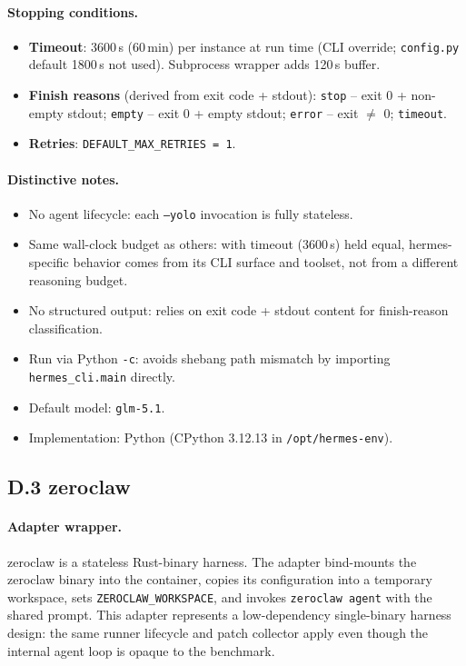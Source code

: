 \documentclass{llmxive}
\begin{document}
\paragraph{Stopping conditions.}
\begin{itemize}
  \item \textbf{Timeout}: 3600\,s (60\,min) per instance at run time (CLI override; \texttt{config.py} default 1800\,s not used). Subprocess wrapper adds 120\,s buffer.
  \item \textbf{Finish reasons} (derived from exit code + stdout): \texttt{stop} -- exit 0 + non-empty stdout; \texttt{empty} -- exit 0 + empty stdout; \texttt{error} -- exit $\neq$ 0; \texttt{timeout}.
  \item \textbf{Retries}: \texttt{DEFAULT\_MAX\_RETRIES = 1}.
\end{itemize}

\paragraph{Distinctive notes.}
\begin{itemize}
  \item No agent lifecycle: each \texttt{--yolo} invocation is fully stateless.
  \item Same wall-clock budget as others: with timeout (3600\,s) held equal, hermes-specific behavior comes from its CLI surface and toolset, not from a different reasoning budget.
  \item No structured output: relies on exit code + stdout content for finish-reason classification.
  \item Run via Python \texttt{-c}: avoids shebang path mismatch by importing \texttt{hermes\_cli.main} directly.
  \item Default model: \texttt{glm-5.1}.
  \item Implementation: Python (CPython 3.12.13 in \texttt{/opt/hermes-env}).
\end{itemize}

\subsection*{D.3 zeroclaw}

\paragraph{Adapter wrapper.}
zeroclaw is a stateless Rust-binary harness. The adapter bind-mounts the zeroclaw binary into the container, copies its configuration into a temporary workspace, sets \texttt{ZEROCLAW\_WORKSPACE}, and invokes \texttt{zeroclaw agent} with the shared prompt. This adapter represents a low-dependency single-binary harness design: the same runner lifecycle and patch collector apply even though the internal agent loop is opaque to the benchmark.
\end{document}
